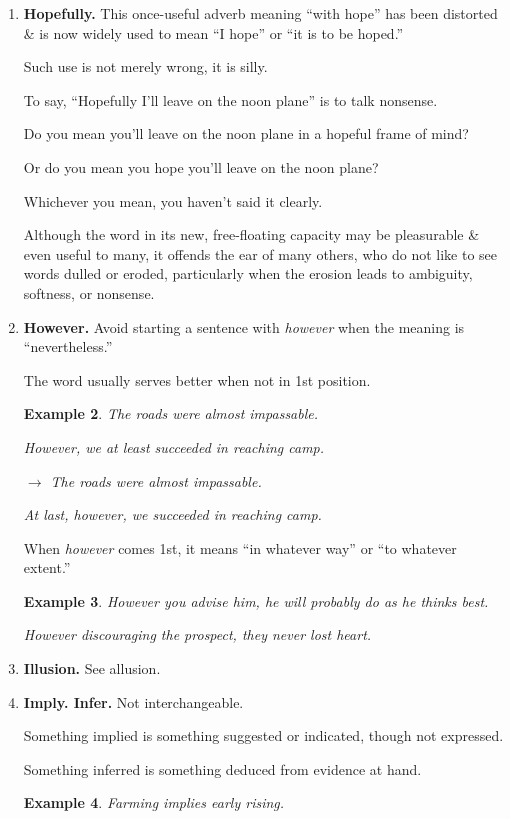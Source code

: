 \documentclass{article}
\newtheorem{example}{Example}
\begin{document}
\begin{enumerate}
\begin{example}
		$\to$ Vermont attracts visitors because of its winter sports.
	\end{example}
	\item {\bf Hopefully.} This once-useful adverb meaning ``with hope'' has been distorted \& is now widely used to mean ``I hope'' or ``it is to be hoped.''
	
	Such use is not merely wrong, it is silly.
	
	To say, ``Hopefully I'll leave on the noon plane'' is to talk nonsense.
	
	Do you mean you'll leave on the noon plane in a hopeful frame of mind?
	
	Or do you mean you hope you'll leave on the noon plane?
	
	Whichever you mean, you haven't said it clearly.
	
	Although the word in its new, free-floating capacity may be pleasurable \& even useful to many, it offends the ear of many others, who do not like to see words dulled or eroded, particularly when the erosion leads to ambiguity, softness, or nonsense.
	\item {\bf However.} Avoid starting a sentence with {\it however} when the meaning is ``nevertheless.''
	
	The word usually serves better when not in 1st position.
	\begin{example}
		The roads were almost impassable.
		
		However, we at least succeeded in reaching camp.
		
		$\to$ The roads were almost impassable.
		
		At last, however, we succeeded in reaching camp.
	\end{example}
	When {\it however} comes 1st, it means ``in whatever way'' or ``to whatever extent.''
	\begin{example}
		However you advise him, he will probably do as he thinks best.
		
		However discouraging the prospect, they never lost heart.
	\end{example}
	\item {\bf Illusion.} See allusion.
	\item {\bf Imply. Infer.} Not interchangeable.
	
	Something implied is something suggested or indicated, though not expressed.
	
	Something inferred is something deduced from evidence at hand.
	\begin{example}
		Farming implies early rising.
		

\end{example}
\end{enumerate}
\end{document}
